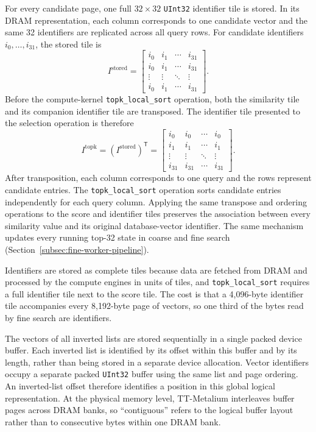 For every candidate page, one full \(32\times32\) \texttt{UInt32} identifier tile is stored. In its DRAM representation, each column corresponds to one candidate vector and the same 32 identifiers are replicated across all query rows. For candidate identifiers \(i_0,\ldots,i_{31}\), the stored tile is
\begin{equation}
I^{\mathrm{stored}}=
\begin{bmatrix}
i_0 & i_1 & \cdots & i_{31}\\
i_0 & i_1 & \cdots & i_{31}\\
\vdots & \vdots & \ddots & \vdots\\
i_0 & i_1 & \cdots & i_{31}
\end{bmatrix}.
\label{eq:identifier-tile}
\end{equation}
Before the compute-kernel \texttt{topk\_local\_sort} operation, both the similarity tile and its companion identifier tile are transposed. The identifier tile presented to the selection operation is therefore
\begin{equation}
I^{\mathrm{topk}}
=
\left(I^{\mathrm{stored}}\right)^{\mathsf T}
=
\begin{bmatrix}
i_0 & i_0 & \cdots & i_0\\
i_1 & i_1 & \cdots & i_1\\
\vdots & \vdots & \ddots & \vdots\\
i_{31} & i_{31} & \cdots & i_{31}
\end{bmatrix}.
\label{eq:identifier-tile-topk}
\end{equation}
After transposition, each column corresponds to one query and the rows represent candidate entries. The \texttt{topk\_local\_sort} operation sorts candidate entries independently for each query column. Applying the same transpose and ordering operations to the score and identifier tiles preserves the association between every similarity value and its original database-vector identifier. The same mechanism updates every running top-32 state in coarse and fine search (Section~\ref{subsec:fine-worker-pipeline}).

Identifiers are stored as complete tiles because data are fetched from DRAM and processed by the compute engines in units of tiles, and \texttt{topk\_local\_sort} requires a full identifier tile next to the score tile. The cost is that a 4,096-byte identifier tile accompanies every 8,192-byte page of vectors, so one third of the bytes read by fine search are identifiers.

The vectors of all inverted lists are stored sequentially in a single packed device buffer. Each inverted list is identified by its offset within this buffer and by its length, rather than being stored in a separate device allocation. Vector identifiers occupy a separate packed \texttt{UInt32} buffer using the same list and page ordering. An inverted-list offset therefore identifies a position in this global logical representation. At the physical memory level, TT-Metalium interleaves buffer pages across DRAM banks, so ``contiguous'' refers to the logical buffer layout rather than to consecutive bytes within one DRAM bank.


